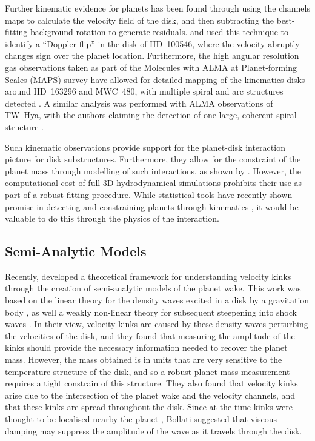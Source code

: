 Further kinematic evidence for planets has been found through using the channels maps to calculate the velocity field of the disk, and then subtracting the best-fitting background rotation to generate residuals.
\citet{casassus2019} and \citet{perez2020} used this technique to identify a ``Doppler flip'' in the disk of HD~100546, where the velocity abruptly changes sign over the planet location.
Furthermore, the high angular resolution gas observations taken as part of the Molecules with ALMA at Planet-forming Scales (MAPS) survey have allowed for detailed mapping of the kinematics disks around HD~163296 and MWC~480, with multiple spiral and arc structures detected \citep{teague2021}.
A similar analysis was performed with ALMA observations of TW~Hya, with the authors claiming the detection of one large, coherent spiral structure \citep{teague2022}.

Such kinematic observations provide support for the planet-disk interaction picture for disk substructures. Furthermore, they allow for the constraint of the planet mass through modelling of such interactions, as shown by \citet{pinte2018a,pinte2019}.
However, the computational cost of full 3D hydrodynamical simulations prohibits their use as part of a robust fitting procedure.
While statistical tools have recently shown promise in detecting and constraining planets through kinematics \citep{izquierdo2021,izquierdo2022}, it would be valuable to do this through the physics of the interaction.

\subsection{Semi-Analytic Models}

Recently, \citet{bollati2021a} developed a theoretical framework for understanding velocity kinks through the creation of semi-analytic models of the planet wake.
This work was based on the linear theory for the density waves excited in a disk by a gravitation body \citep{goldreich1980}, as well a weakly non-linear theory for subsequent steepening into shock waves \citep{goodman2001,rafikov2002a}.
In their view, velocity kinks are caused by these density waves perturbing the velocities of the disk, and they found that measuring the amplitude of the kinks should provide the necessary information needed to recover the planet mass.
However, the mass obtained is in units that are very sensitive to the temperature structure of the disk, and so a robust planet mass measurement requires a tight constrain of this structure.
They also found that velocity kinks arise due to the intersection of the planet wake and the velocity channels, and that these kinks are spread throughout the disk.
Since at the time kinks were thought to be localised nearby the planet \citep{pinte2018a,pinte2019,pinte2020}, Bollati suggested that viscous damping may suppress the amplitude of the wave as it travels through the disk.

